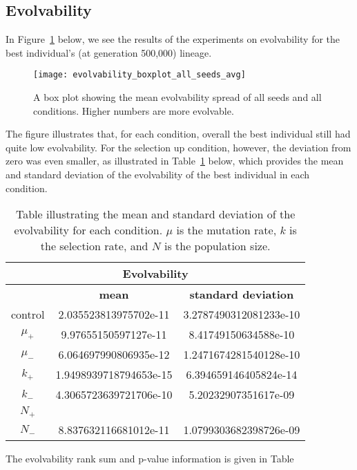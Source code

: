 \subsection{Evolvability}
In Figure~\ref{fig:evolvability_mean} below, we see the results of the experiments on evolvability for the best individual's (at generation 500,000) lineage. 
\begin{figure}[H]
	\centering
	\texttt{[image: evolvability\_boxplot\_all\_seeds\_avg]}
	\caption[Evolvability boxplot]{A box plot showing the mean evolvability spread of all seeds and all conditions. Higher numbers are more evolvable.}
	\label{fig:evolvability_mean}	
\end{figure}
The figure illustrates that, for each condition, overall the best individual still had quite low evolvability. For the selection up condition, however, the deviation from zero was even smaller, as illustrated in Table~\ref{table:mean_std_dev_evolvability} below, which provides the mean and standard deviation of the evolvability of the best individual in each condition. 

\begin{table}[H]
	\centering
	\begin{tabular}{| c | c | c |}
		\hline
		\multicolumn{3}{c}{\Large Evolvability} \\
		\hline
		& \textbf{mean} & \textbf{standard deviation}\\
		\hline
		\hline
		control & 2.035523813975702e-11 & 3.2787490312081233e-10\\
		\hline
		$\mu_+$ & 9.97655150597127e-11 & 8.41749150634588e-10 \\
		\hline
		$\mu_-$ & 6.064697990806935e-12 & 1.2471674281540128e-10 \\
		\hline
		$k_+$ & 1.9498939718794653e-15 & 6.394659146405824e-14 \\
		\hline
		$k_-$ & 4.3065723639721706e-10 & 5.20232907351617e-09 \\
		\hline
		$N_+$ &  & \\
		\hline
		$N_-$ & 8.837632116681012e-11 &  1.0799303682398726e-09 \\
		\hline	 		 
	\end{tabular}
	\caption[Evolvability mean and standard deviation]{Table illustrating the mean and standard deviation of the evolvability for each condition. $\mu$ is the mutation rate, $k$ is the selection rate, and $N$ is the population size.}
	\label{table:mean_std_dev_evolvability}
\end{table}
The evolvability rank sum and p-value information is given in Table~

